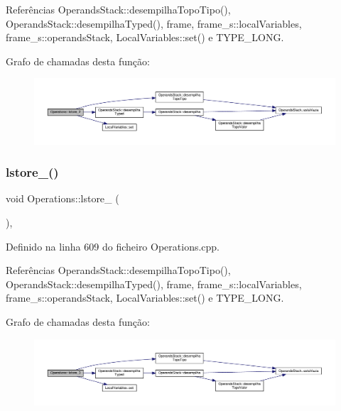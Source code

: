 Referências Operands\+Stack\+::desempilha\+Topo\+Tipo(), Operands\+Stack\+::desempilha\+Typed(), frame, frame\+\_\+s\+::local\+Variables, frame\+\_\+s\+::operands\+Stack, Local\+Variables\+::set() e T\+Y\+P\+E\+\_\+\+L\+O\+NG.

Grafo de chamadas desta função\+:\nopagebreak
\begin{figure}[H]
\begin{center}
\leavevmode
\includegraphics[width=350pt]{classOperations_a178660c2b3ca2625c140daf867531386_cgraph}
\end{center}
\end{figure}
\mbox{\label{classOperations_a00d5ca7ea5a68e9cccfdc26b11a716bf}} 
\subsubsection{\texorpdfstring{lstore\+\_()}{lstore\_3()}}
{\footnotesize\ttfamily void Operations\+::lstore\+\_ (\begin{DoxyParamCaption}{ }\end{DoxyParamCaption})\hspace{0.3cm}{\ttfamily [static]}, {\ttfamily [private]}}



Definido na linha 609 do ficheiro Operations.\+cpp.



Referências Operands\+Stack\+::desempilha\+Topo\+Tipo(), Operands\+Stack\+::desempilha\+Typed(), frame, frame\+\_\+s\+::local\+Variables, frame\+\_\+s\+::operands\+Stack, Local\+Variables\+::set() e T\+Y\+P\+E\+\_\+\+L\+O\+NG.

Grafo de chamadas desta função\+:\nopagebreak
\begin{figure}[H]
\begin{center}
\leavevmode
\includegraphics[width=350pt]{classOperations_a00d5ca7ea5a68e9cccfdc26b11a716bf_cgraph}
\end{center}
\end{figure}
\mbox{\label{classOperations_a32485b21761b1e5540a6575822a2661a}} 

